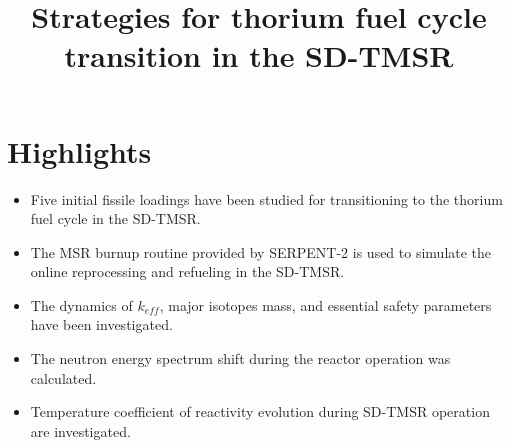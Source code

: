 \documentclass[review]{elsarticle}
\begin{document}
\begin{frontmatter}
\title{Strategies for thorium fuel cycle transition in the SD-TMSR}
\end{frontmatter}
\section*{Highlights}
\begin{itemize}
	\item Five initial fissile loadings have been studied for transitioning to the thorium fuel cycle in the SD-TMSR.
	\item The MSR burnup routine provided by SERPENT-2 is used to simulate the online reprocessing and refueling in the SD-TMSR.
	\item The dynamics of $k_{eff}$, major isotopes mass, and essential safety parameters have been investigated.
	\item The neutron energy spectrum shift during the reactor operation was calculated.
	\item Temperature coefficient of reactivity evolution during SD-TMSR operation are investigated.
\end{itemize}
\end{document}
